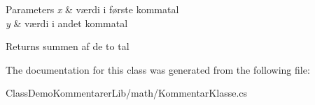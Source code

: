 \begin{DoxyParams}{Parameters}
{\em x} & værdi i første kommatal\\
\hline
{\em y} & værdi i andet kommatal\\
\hline
\end{DoxyParams}
\begin{DoxyReturn}{Returns}
summen af de to tal
\end{DoxyReturn}


The documentation for this class was generated from the following file\+:\begin{DoxyCompactItemize}
\item 
Class\+Demo\+Kommentarer\+Lib/math/Kommentar\+Klasse.\+cs\end{DoxyCompactItemize}
